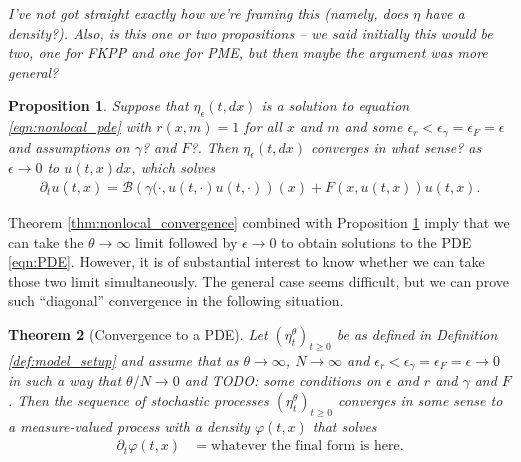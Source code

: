 \documentclass[12pt]{article}
\newtheorem{theorem}{Theorem}[section]
\newtheorem{proposition}[theorem]{Proposition}
\newcommand{\DG}{\mathcal{B}}  %
\newcommand{\comment}[1]{{\color{blue} \it #1}}
\begin{document}
\comment{I've not got straight exactly how we're framing this
    (namely, does $\eta$ have a density?).
    Also, is this one or two propositions --
    we said initially this would be two,
    one for FKPP and one for PME,
    but then maybe the argument was more general?
}

\begin{proposition}
    \label{prop:nonlocal_to_local}
    Suppose that $\eta_\epsilon(t,dx)$ is a solution to equation \eqref{eqn:nonlocal_pde}
    with $r(x, m) = 1$ for all $x$ and $m$
    and some $\epsilon_r < \epsilon_\gamma = \epsilon_F = \epsilon$
    \comment{and assumptions on $\gamma$? and $F$?}.
    Then $\eta_\epsilon(t, dx)$ converges \comment{in what sense?} as $\epsilon \to 0$
    to $u(t, x) dx$, which solves
    \begin{align} \label{eqn:PDE}
        \partial_t u(t, x)
        =
        \DG \left( \gamma(\cdot, u(t, \cdot) u(t, \cdot)  \right)(x)
        + F(x, u(t, x)) u(t, x) .
    \end{align}
\end{proposition}

Theorem \ref{thm:nonlocal_convergence} combined with Proposition \ref{prop:nonlocal_to_local}
imply that we can take the $\theta \to \infty$ limit
followed by $\epsilon \to 0$
to obtain solutions to the PDE \eqref{eqn:PDE}.
However, it is of substantial interest to know whether
we can take those two limit simultaneously.
The general case seems difficult,
but we can prove such ``diagonal'' convergence in the following situation.

\begin{theorem}[Convergence to a PDE]
    \label{thm:local_convergence}
    Let $(\eta^\theta_t)_{t \geq 0}$
    be as defined in Definition \ref{def:model_setup}
    and assume that as $\theta \to \infty$, $N \to \infty$
    and $\epsilon_r < \epsilon_\gamma = \epsilon_F = \epsilon \to 0$
    in such a way that $\theta/N \to 0$
    and
    \comment{TODO: some conditions on $\epsilon$ and $r$ and $\gamma$ and $F$}.
    Then the sequence of stochastic processes $(\eta^\theta_t)_{t \ge 0}$
    converges \comment{in some sense}
    to a measure-valued process with a density $\varphi(t, x)$
    that solves
    \begin{align}
        \partial_t \varphi(t, x)
        &=
        \text{whatever the final form is here} .
    \end{align}
\end{theorem}


\end{document}
